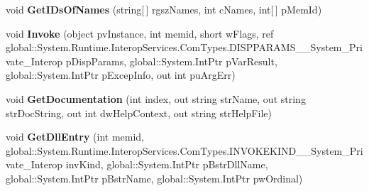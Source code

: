\begin{DoxyCompactItemize}
\item 
\mbox{\label{interface_system_1_1_runtime_1_1_interop_services_1_1_com_types_1_1_i_type_info_____system___private___interop_a6aa20dbdd253a9bb2b4072bf7d6ea031}} 
void {\bfseries Get\+I\+Ds\+Of\+Names} (string\mbox{[}$\,$\mbox{]} rgsz\+Names, int c\+Names, int\mbox{[}$\,$\mbox{]} p\+Mem\+Id)
\item 
\mbox{\label{interface_system_1_1_runtime_1_1_interop_services_1_1_com_types_1_1_i_type_info_____system___private___interop_a75ad94dc5c9adbb0a9b1de1c846b395e}} 
void {\bfseries Invoke} (object pv\+Instance, int memid, short w\+Flags, ref global\+::\+System.\+Runtime.\+Interop\+Services.\+Com\+Types.\+D\+I\+S\+P\+P\+A\+R\+A\+M\+S\+\_\+\+\_\+\+System\+\_\+\+Private\+\_\+\+Interop p\+Disp\+Params, global\+::\+System.\+Int\+Ptr p\+Var\+Result, global\+::\+System.\+Int\+Ptr p\+Excep\+Info, out int pu\+Arg\+Err)
\item 
\mbox{\label{interface_system_1_1_runtime_1_1_interop_services_1_1_com_types_1_1_i_type_info_____system___private___interop_a3c7cc84cf38e70c6a8f2599ea99597fb}} 
void {\bfseries Get\+Documentation} (int index, out string str\+Name, out string str\+Doc\+String, out int dw\+Help\+Context, out string str\+Help\+File)
\item 
\mbox{\label{interface_system_1_1_runtime_1_1_interop_services_1_1_com_types_1_1_i_type_info_____system___private___interop_a943dffd3908114326ac1e08d036b2aa7}} 
void {\bfseries Get\+Dll\+Entry} (int memid, global\+::\+System.\+Runtime.\+Interop\+Services.\+Com\+Types.\+I\+N\+V\+O\+K\+E\+K\+I\+N\+D\+\_\+\+\_\+\+System\+\_\+\+Private\+\_\+\+Interop inv\+Kind, global\+::\+System.\+Int\+Ptr p\+Bstr\+Dll\+Name, global\+::\+System.\+Int\+Ptr p\+Bstr\+Name, global\+::\+System.\+Int\+Ptr pw\+Ordinal)
\item 
\mbox{\label{interface_system_1_1_runtime_1_1_interop_services_1_1_com_types_1_1_i_type_info_____system___private___interop_af4dec31689d92f94d3290424d918deaf}} 

\end{DoxyCompactItemize}
